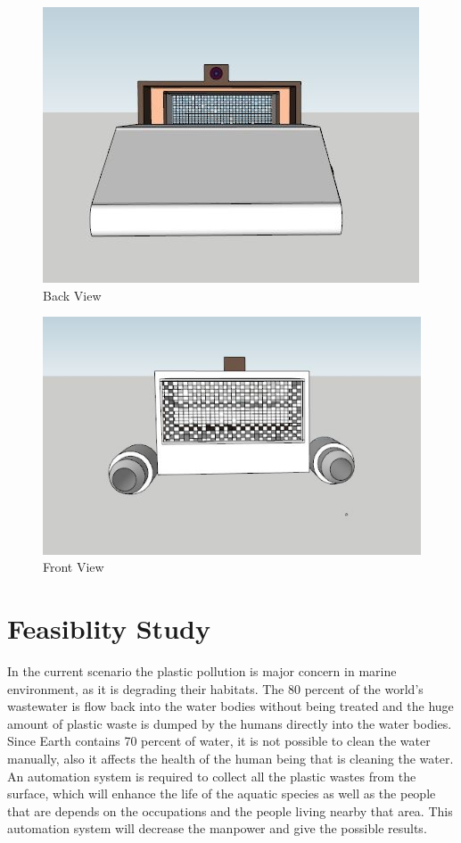 \documentclass{article}
\begin{document}
\begin{figure}
	\includegraphics[width=\linewidth]{front.jpg}
	\caption{Back View}
\end{figure}
\begin{figure}
	\includegraphics[width=\linewidth]{back.jpg}
	\caption{Front View}
\end{figure}

\section{Feasiblity Study}
In the current scenario the plastic pollution is major concern in marine environment, as it is degrading their habitats. The 80 percent of the world’s wastewater is flow back into the water bodies without being treated and the huge amount of plastic waste is dumped by the humans directly into the water bodies. Since Earth contains 70 percent of water, it is not possible to clean the water manually, also it affects the health of the human being that is cleaning the water. An automation system is required to collect all the plastic wastes from the surface, which will enhance the life of the aquatic species as well as the people that are depends on the occupations and the people living nearby that area. This automation system will decrease the manpower and give the possible results.
\end{document}
